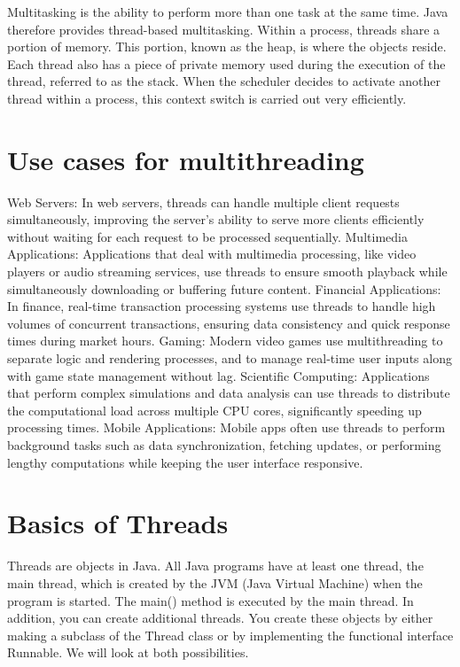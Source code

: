 Multitasking is the ability to perform more than one task at the same time. Java therefore provides thread-based multitasking. Within a process, threads share a portion of memory. This portion, known as the heap, is where the objects reside. Each thread also has a piece of private memory used during the execution of the thread, referred to as the stack. When the scheduler decides to activate another thread within a process, this context switch is carried out very efficiently.

\section{Use cases for multithreading}

Web Servers: In web servers, threads can handle multiple client requests simultaneously, improving the server's ability to serve more clients efficiently without waiting for each request to be processed sequentially.
Multimedia Applications: Applications that deal with multimedia processing, like video players or audio streaming services, use threads to ensure smooth playback while simultaneously downloading or buffering future content.
Financial Applications: In finance, real-time transaction processing systems use threads to handle high volumes of concurrent transactions, ensuring data consistency and quick response times during market hours.
Gaming: Modern video games use multithreading to separate logic and rendering processes, and to manage real-time user inputs along with game state management without lag.
Scientific Computing: Applications that perform complex simulations and data analysis can use threads to distribute the computational load across multiple CPU cores, significantly speeding up processing times.
Mobile Applications: Mobile apps often use threads to perform background tasks such as data synchronization, fetching updates, or performing lengthy computations while keeping the user interface responsive.

\section{Basics of Threads}

Threads are objects in Java. All Java programs have at least one thread, the main thread, which is created by the JVM (Java Virtual Machine) when the program is started. The main() method is executed by the main thread. In addition, you can create additional threads. You create these objects by either making a subclass of the Thread class or by implementing the functional interface Runnable. We will look at both possibilities.


